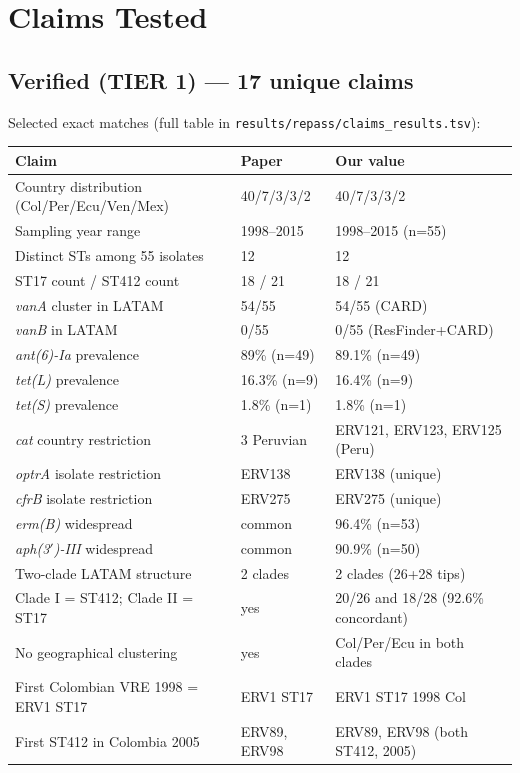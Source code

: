 \documentclass[11pt,letterpaper]{article}
\begin{document}
\section{Claims Tested}

\subsection{Verified (TIER 1) --- 17 unique claims}
Selected exact matches (full table in \texttt{results/repass/claims\_results.tsv}):

\begin{longtable}{@{}p{}p{}p{}@{}}
\toprule
\textbf{Claim} & \textbf{Paper} & \textbf{Our value} \\
\midrule
\endhead
Country distribution (Col/Per/Ecu/Ven/Mex) & 40/7/3/3/2 & 40/7/3/3/2 \\
Sampling year range & 1998--2015 & 1998--2015 (n=55) \\
Distinct STs among 55 isolates & 12 & 12 \\
ST17 count / ST412 count & 18 / 21 & 18 / 21 \\
\emph{vanA} cluster in LATAM & 54/55 & 54/55 (CARD) \\
\emph{vanB} in LATAM & 0/55 & 0/55 (ResFinder+CARD) \\
\emph{ant(6)-Ia} prevalence & 89\% (n=49) & 89.1\% (n=49) \\
\emph{tet(L)} prevalence & 16.3\% (n=9) & 16.4\% (n=9) \\
\emph{tet(S)} prevalence & 1.8\% (n=1) & 1.8\% (n=1) \\
\emph{cat} country restriction & 3 Peruvian & ERV121, ERV123, ERV125 (Peru) \\
\emph{optrA} isolate restriction & ERV138 & ERV138 (unique) \\
\emph{cfrB} isolate restriction & ERV275 & ERV275 (unique) \\
\emph{erm(B)} widespread & common & 96.4\% (n=53) \\
\emph{aph(3$'$)-III} widespread & common & 90.9\% (n=50) \\
Two-clade LATAM structure & 2 clades & 2 clades (26+28 tips) \\
Clade I = ST412; Clade II = ST17 & yes & 20/26 and 18/28 (92.6\% concordant) \\
No geographical clustering & yes & Col/Per/Ecu in both clades \\
First Colombian VRE 1998 = ERV1 ST17 & ERV1 ST17 & ERV1 ST17 1998 Col \\
First ST412 in Colombia 2005 & ERV89, ERV98 & ERV89, ERV98 (both ST412, 2005) \\
\bottomrule
\end{longtable}
\end{document}
